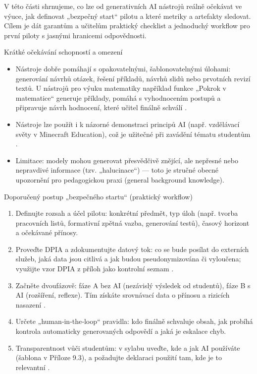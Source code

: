 
V této části shrnujeme, co lze od generativních AI nástrojů reálně očekávat ve výuce, jak definovat „bezpečný start“ pilotu a které metriky a artefakty sledovat. Cílem je dát garantům a učitelům praktický checklist a jednoduchý workflow pro první piloty s jasnými hranicemi odpovědnosti.

Krátké očekávání schopností a omezení
\begin{itemize}
  \item Nástroje dobře pomáhají s opakovatelnými, šablonovatelnými úlohami: generování návrhů otázek, řešení příkladů, návrhů slidů nebo prvotních revizí textů. U nástrojů pro výuku matematiky například funkce „Pokrok v matematice“ generuje příklady, pomáhá s vyhodnocením postupů a připravuje návrh hodnocení, které učitel finálně schválí \cite{kb_ai_101_tipu_pdf_04e4a115_page_8_1}.
  \item Nástroje lze použít i k názorné demonstraci principů AI (např. vzdělávací světy v Minecraft Education), což je užitečné při zavádění tématu studentům \cite{kb_ai_101_tipu_pdf_04e4a115_page_15_2}.
  \item Limitace: modely mohou generovat přesvědčivě znějící, ale nepřesné nebo nepravdivé informace (tzv. „halucinace“) — toto je stručné obecné upozornění pro pedagogickou praxi (general background knowledge).
\end{itemize}

Doporučený postup „bezpečného startu“ (praktický workflow)
\begin{enumerate}
  \item Definujte rozsah a účel pilotu: konkrétní předmět, typ úloh (např. tvorba pracovních listů, formativní zpětná vazba, generování testů), časový horizont a očekávané přínosy.
  \item Proveďte DPIA a zdokumentujte datový tok: co se bude posílat do externích služeb, jaká data jsou citlivá a jak budou pseudonymizována či vyloučena; využijte vzor DPIA z příloh jako kontrolní seznam \cite{kb_malinka_chatgpt_ve_vyuce_dva_roky_pote_2024_pdf_90bc3aaf_page_12_1}.
  \item Začněte dvoufázově: fáze A bez AI (nezávislý výsledek od studentů), fáze B s AI (rozšíření, reflexe). Tím získáte srovnávací data o přínosu a rizicích nasazení \cite{kb_malinka_chatgpt_ve_vyuce_dva_roky_pote_2024_pdf_90bc3aaf_page_12_1}.
  \item Určete „human‑in‑the‑loop“ pravidla: kdo finálně schvaluje obsah, jak probíhá kontrola automaticky generovaných odpovědí a jaká je eskalace chyb.
  \item Transparentnost vůči studentům: v sylabu uveďte, kde a jak AI používáte (šablona v Příloze 9.3), a požadujte deklaraci použití tam, kde je to relevantní \cite{kb_malinka_chatgpt_ve_vyuce_dva_roky_pote_2024_pdf_90bc3aaf_page_12_1}.
\end{enumerate}

